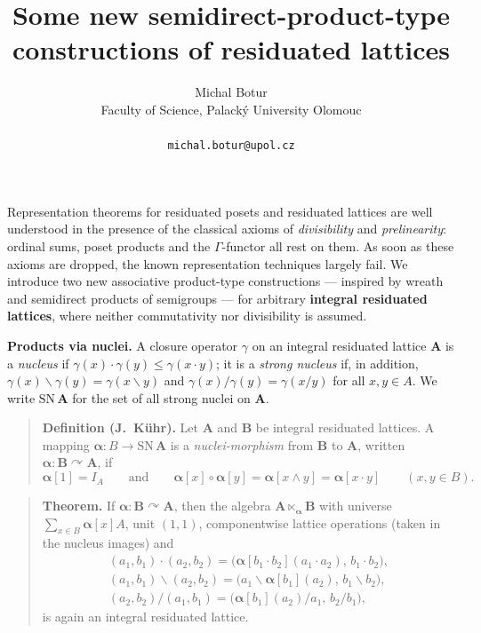 \documentclass[a4paper]{article} %
\date{} %
\newcommand{\al}[1]{\mathbf{#1}}
\newcommand{\nmorph}{\curvearrowright}
\newcommand{\sn}[1]{\mathrm{SN}\,\mathbf{#1}}
\begin{document}
\setcounter{page}{1} %
\title{Some new semidirect-product-type constructions of residuated lattices}
\author{Michal Botur \\ %
       Faculty of Science, Palack\'y University Olomouc\\ \\ %
       \texttt{michal.botur@upol.cz}
       }%
\maketitle

Representation theorems for residuated posets and residuated lattices are
well understood in the presence of the classical axioms of \emph{divisibility}
and \emph{prelinearity}: ordinal sums, poset products and the $\Gamma$-functor
all rest on them. As soon as these axioms are dropped, the known
representation techniques largely fail. We introduce two new
associative product-type constructions --- inspired by wreath and
semidirect products of semigroups --- for arbitrary \textbf{integral
residuated lattices}, where neither commutativity nor divisibility is
assumed.

\medskip
\noindent\textbf{Products via nuclei.}
A closure operator $\gamma$ on an integral residuated lattice $\al A$ is a
\emph{nucleus} if $\gamma(x)\cdot\gamma(y)\leq\gamma(x\cdot y)$; it is a
\emph{strong nucleus} if, in addition,
$\gamma(x)\backslash\gamma(y)=\gamma(x\backslash y)$ and
$\gamma(x)/\gamma(y)=\gamma(x/y)$ for all $x,y\in A$. We write $\sn A$ for
the set of all strong nuclei on $\al A$.

\begin{quote}
\textbf{Definition (J.~K\"uhr).}
Let $\al A$ and $\al B$ be integral residuated lattices. A mapping
$\bm\alpha\colon B\to\sn A$ is a \emph{nuclei-morphism} from $\al B$ to
$\al A$, written $\bm\alpha\colon\al B\nmorph\al A$, if
$$\bm\alpha[1]=I_A\qquad\text{and}\qquad
\bm\alpha[x]\circ\bm\alpha[y]=\bm\alpha[x\wedge y]=\bm\alpha[x\cdot y]
\qquad(x,y\in B).$$
\end{quote}

\begin{quote}
\textbf{Theorem.}
If $\bm\alpha\colon\al B\nmorph\al A$, then the algebra
$\al A\ltimes_{\bm\alpha}\al B$ with universe
$\sum_{x\in B}\bm\alpha[x]A$, unit $(1,1)$, componentwise lattice
operations (taken in the nucleus images) and
\begin{gather*}
(a_1,b_1)\cdot(a_2,b_2)=\big(\bm\alpha[b_1\cdot b_2](a_1\cdot a_2),\,b_1\cdot b_2\big),\\
(a_1,b_1)\backslash(a_2,b_2)=\big(a_1\backslash\bm\alpha[b_1](a_2),\,b_1\backslash b_2\big),\\
(a_2,b_2)/(a_1,b_1)=\big(\bm\alpha[b_1](a_2)/a_1,\,b_2/b_1\big),
\end{gather*}
is again an integral residuated lattice.
\end{quote}
\end{document}
